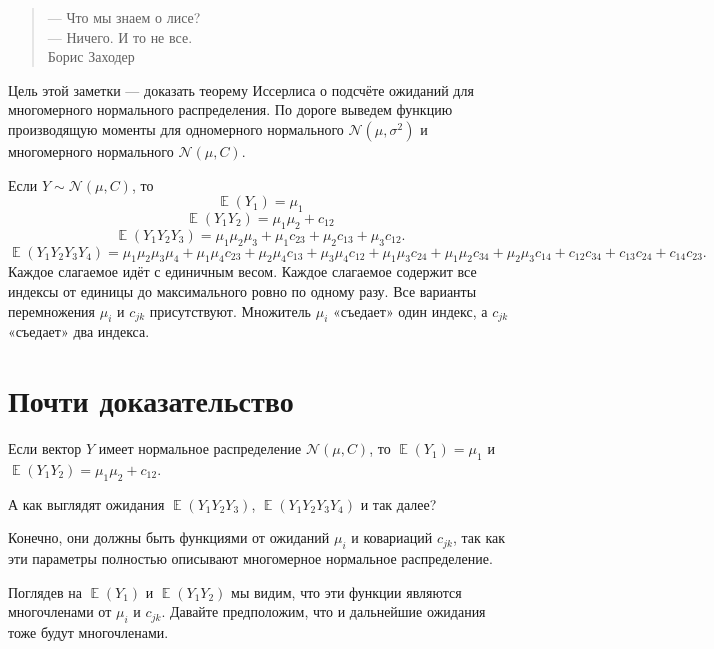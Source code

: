 \documentclass[12pt]{article}
\DeclareMathOperator{\E}{\mathbb{E}}
\newcommand{\cN}{\mathcal{N}}
\begin{document}
\begin{verse}
    \begin{flushright}
        — Что мы знаем о лисе? \\
        — Ничего. И то не все. \\

        Борис Заходер
    \end{flushright}
\end{verse}

Цель этой заметки — доказать теорему Иссерлиса о подсчёте ожиданий для многомерного нормального распределения.
По дороге выведем функцию производящую моменты для одномерного нормального $\cN(\mu, \sigma^2)$ и многомерного нормального $\cN(\mu, C)$.

\begin{tcolorbox}[colback=yellow!50!red!25!white]
    Если $Y \sim \cN(\mu, C)$, то
    \[
    \E(Y_1) = \mu_1
    \]
    \[
    \E(Y_1 Y_2) = \mu_1 \mu_2 + c_{12}
    \]
    \[
        \E(Y_1 Y_2 Y_3) = \mu_1 \mu_2 \mu_3 + \mu_1 c_{23} + \mu_2 c_{13} + \mu_3 c_{12}.
    \]
    \[
        \E(Y_1 Y_2 Y_3 Y_4) = \mu_1 \mu_2\mu_3 \mu_4 + \mu_1 \mu_4 c_{23} + \mu_2 \mu_4 c_{13} + \mu_3 \mu_4 c_{12} + \mu_1 \mu_3 c_{24} + \mu_1 \mu_2 c_{34} + \mu_2 \mu_3 c_{14} +  c_{12}c_{34} + c_{13}c_{24} + c_{14}c_{23}.
    \]
    Каждое слагаемое идёт с единичным весом.
    Каждое слагаемое содержит все индексы от единицы до максимального ровно по одному разу. 
    Все варианты перемножения $\mu_i$ и $c_{jk}$ присутствуют. 
    Множитель $\mu_i$ «съедает» один индекс, а $c_{jk}$ «съедает» два индекса. 
    \end{tcolorbox}

\section*{Почти доказательство}

Если вектор $Y$ имеет нормальное распределение $\cN(\mu, C)$, то $\E(Y_1) = \mu_1$ и $\E(Y_1 Y_2) = \mu_1 \mu_2 + c_{12}$.

А как выглядят ожидания $\E(Y_1 Y_2 Y_3)$, $\E(Y_1 Y_2 Y_3 Y_4)$ и так далее?

Конечно, они должны быть функциями от ожиданий $\mu_i$ и ковариаций $c_{jk}$, так как эти параметры полностью описывают многомерное нормальное распределение. 

Поглядев на $\E(Y_1)$ и $\E(Y_1 Y_2)$ мы видим, что эти функции являются многочленами от $\mu_i$ и $c_{jk}$.
Давайте предположим, что и дальнейшие ожидания тоже будут многочленами.
\end{document}
